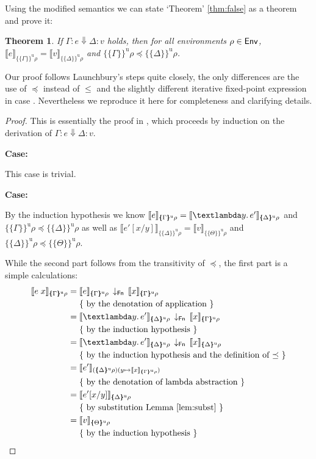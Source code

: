\documentclass{jfp1}
\newtheorem{theorem}{Theorem}
\theoremstyle{nonumberbreak}
\newtheorem{proof}{Proof}
\newcommand{\sEnv}  {\text{\textsf{Env}}}
\newcommand{\sFnProj}[2]{#1\,\downarrow_{\text{\textsf{Fn}}}\,#2}
\newcommand{\sApp}[2]{#1\;#2}
\newcommand{\sLam}[2]{\text{\textlambda} #1.\, #2}
\newcommand{\sred}[4]{#1 : #2 \Downarrow #3 : #4}
\newcommand{\sRule}[1]{\text{{\textsc{#1}}}}
\newcommand{\dsem}[2]{\llbracket #1 \rrbracket_{#2}}
\newcommand{\esemu}[1]{\{\!\!\!\{#1\}\!\!\!\}^{\text{u}}}
\newcommand{\case}[1]{\par\smallskip\noindent\textbf{Case:} #1\nopagebreak\par\noindent\ignorespaces}
\newcommand{\aexpl}[1]{&\mathrel{\phantom{=}}\left\{\text{ #1 }\right\}}
\begin{document}
Using the modified semantics we can state `Theorem' \ref{thm:false} as a theorem and prove it:
\begin{theorem}
If $\sred \Gamma e \Delta v$ holds, then for all environments $\rho \in \sEnv$, $\dsem{e}{\esemu{\Gamma}{\rho}} = \dsem{v}{\esemu{\Delta}{\rho}}$ and $\esemu\Gamma\rho \preceq \esemu\Delta\rho$.%
\label{thm:thm2}
\end{theorem}

Our proof follows Launchbury's steps quite closely, the only differences are the use of $\preceq$ instead of $\le$ and the slightly different iterative fixed-point expression in case \sRule{Var}. Nevertheless we reproduce it here for completeness and clarifying details.

\begin{proof}
This is essentially the proof in \cite{launchbury}, which proceeds by induction on the derivation of $\sred \Gamma e \Delta v$.

\case{\sRule{Lam}}
This case is trivial.

\case{\sRule{App}}
By the induction hypothesis we know
$\dsem{e}{\esemu{\Gamma}\rho} = \dsem{\sLam y {e'}}{\esemu{\Delta}\rho}$ and $\esemu{\Gamma}\rho \preceq \esemu{\Delta}\rho$ as well as $\dsem{e'[x/y]}{\esemu{\Delta}\rho} = \dsem{v}{\esemu{\Theta}\rho}$ and $\esemu{\Delta}\rho \preceq \esemu{\Theta}\rho$.

While the second part follows from the transitivity of $\preceq$, the first part is a simple calculations:
\begin{align*}
\dsem{\sApp{e}{x}}{\esemu{\Gamma}\rho} &= \sFnProj{\dsem{e}{\esemu{\Gamma}\rho}}{\dsem{x}{\esemu{\Gamma}{\rho}}}\\
\aexpl{by the denotation of application} \\
&= \sFnProj{\dsem{\sLam y {e'}}{\esemu{\Delta}\rho}}{\dsem{x}{\esemu{\Gamma}{\rho}}}\\ 
\aexpl{by the induction hypothesis} \\
&= \sFnProj{\dsem{\sLam y {e'}}{\esemu{\Delta}\rho}}{\dsem{x}{\esemu{\Delta}{\rho}}}\\ 
\aexpl{by the induction hypothesis and the definition of $\preceq$} \\
&= \dsem{e'}{(\esemu{\Delta}\rho)(y \mapsto \dsem{x}{\esemu{\Gamma}{\rho}})}\\ 
\aexpl{by the denotation of lambda abstraction} \\
&= \dsem{e'[x/y]}{\esemu{\Delta}\rho}\\ 
\aexpl{by substitution Lemma \ref{lem:subst}} \\
&= \dsem{v}{\esemu{\Theta}\rho}\\
\aexpl{by the induction hypothesis}
\end{align*}


\end{proof}
\end{document}
